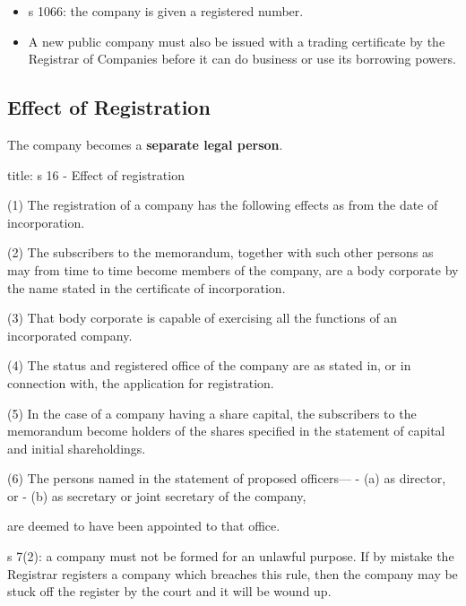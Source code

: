 \documentclass[
]{article}
\newenvironment{Shaded}{}{}
\newcommand{\NormalTok}[1]{#1}
\providecommand{\tightlist}{%
  \setlength{\itemsep}{0pt}\setlength{\parskip}{0pt}}
\begin{document}
\begin{itemize}
\tightlist
\item
  s 1066: the company is given a registered number.
\item
  A new public company must also be issued with a trading certificate by
  the Registrar of Companies before it can do business or use its
  borrowing powers.
\end{itemize}

\hypertarget{effect-of-registration}{%
\subsection{Effect of Registration}\label{effect-of-registration}}

The company becomes a \textbf{separate legal person}.

\begin{Shaded}
\begin{Highlighting}[]
\NormalTok{title: s 16 {-} Effect of registration}

\NormalTok{(1) The registration of a company has the following effects as from the date of incorporation.}

\NormalTok{(2) The subscribers to the memorandum, together with such other persons as may from time to time become members of the company, are a body corporate by the name stated in the certificate of incorporation.}

\NormalTok{(3) That body corporate is capable of exercising all the functions of an incorporated company.}

\NormalTok{(4) The status and registered office of the company are as stated in, or in connection with, the application for registration.}

\NormalTok{(5) In the case of a company having a share capital, the subscribers to the memorandum become holders of the shares specified in the statement of capital and initial shareholdings.}

\NormalTok{(6) The persons named in the statement of proposed officers—}
\NormalTok{{-} (a) as director, or}
\NormalTok{{-} (b) as secretary or joint secretary of the company,}

\NormalTok{are deemed to have been appointed to that office.}
\end{Highlighting}
\end{Shaded}

s 7(2): a company must not be formed for an unlawful purpose. If by
mistake the Registrar registers a company which breaches this rule, then
the company may be stuck off the register by the court and it will be
wound up.
\end{document}
